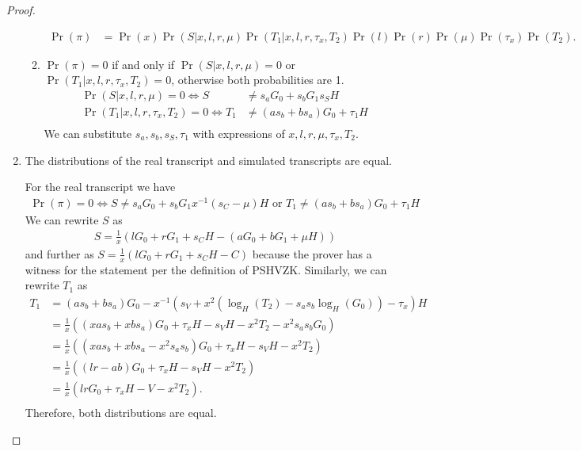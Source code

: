 \begin{proof}
\begin{enumerate}
\begin{innerproof}
\begin{enumerate}
\begin{align*}
      \Pr(\pi) &= \Pr(x) \Pr(S| x, l, r, \mu) \Pr(T_1| x, l, r, \tau_x, T_2) \Pr(l)\Pr(r)\Pr(\mu)\Pr(\tau_x )\Pr(T_2).
       \end{align*}
     \item $\Pr(\pi) = 0$ if and only if $\Pr(S| x, l, r, \mu) = 0$ or $\Pr(T_1| x, l, r, \tau_x, T_2) = 0$, otherwise both probabilities are 1.
       \begin{align*}
       \Pr(S| x, l, r, \mu) = 0 \Leftrightarrow S &\ne s_aG_0 + s_bG_1 s_SH\\
       \Pr(T_1| x, l, r, \tau_x, T_2) = 0 \Leftrightarrow T_1 &\ne (as_b + bs_a)G_0 + \tau_1H\\
       \end{align*}
       We can substitute $s_a, s_b, s_S, \tau_1$ with expressions of $x, l, r, \mu, \tau_x, T_2$.
     \end{enumerate}
    \end{innerproof}
  \item The distributions of the real transcript and simulated transcripts are equal.
  \begin{innerproof}
    For the real transcript we have
    \begin{align*}
      \Pr(\pi) = 0 \Leftrightarrow S \ne s_aG_0 + s_bG_1 x^{-1}(s_C - \mu)H \text{ or } T_1 \ne (as_b + bs_a)G_0 + \tau_1H
      \end{align*}
      We can rewrite $S$ as
      \begin{align*}
        S = \frac{1}{x}(lG_0 + rG_1 + s_CH - (aG_0 + bG_1 + \mu H))
      \end{align*}
      and further as $S = \frac{1}{x}(lG_0 + rG_1 + s_CH - C)$ because the prover has a witness for the statement per the definition of PSHVZK.
      Similarly, we can rewrite $T_1$ as
      \begin{align*}
        T_1 &= (as_b + bs_a)G_0 - x^{-1}(s_V  + x^2(\log_H(T_2) - s_as_b\log_H(G_0)) - \tau_x)H\\
            &= \frac{1}{x}((xas_b + xbs_a)G_0 + \tau_xH - s_VH - x^2T_2 - x^2s_as_bG_0)\\
            &= \frac{1}{x}((xas_b + xbs_a - x^2s_as_b)G_0 + \tau_xH - s_VH - x^2T_2)\\
            &= \frac{1}{x}((lr - ab)G_0 + \tau_xH - s_VH - x^2T_2)\\
            &= \frac{1}{x}(lr G_0 + \tau_xH - V - x^2T_2).\\
      \end{align*}
      Therefore, both distributions are equal.
  \end{innerproof}
 \end{enumerate}
\end{proof}

